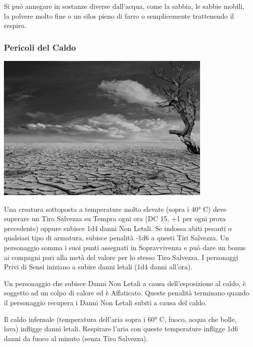 \begin{multicols}{2}
Si può annegare in sostanze diverse dall'acqua, come la sabbia, le sabbie mobili, la polvere molto fine o un silos pieno di farro o semplicemente trattenendo il respiro.

\subsubsection{Pericoli del Caldo}

\begin{center}
	\includegraphics[height=0.65\linewidth]{immagini/desert.png}
\end{center}


\label{pericoli-del-caldo}

Una creatura sottoposta a temperature molto elevate (sopra i 40° C) deve superare un Tiro Salvezza su Tempra ogni ora (DC 15, +1 per ogni prova precedente) oppure subisce 1d4 danni Non Letali. Se indossa abiti pesanti o qualsiasi tipo di armatura, subisce penalità -1d6 a questi Tiri Salvezza. Un personaggio somma i suoi punti assegnati in Sopravvivenza e può dare un bonus ai compagni pari alla metà del valore per lo stesso Tiro Salvezza. I personaggi Privi di Sensi iniziano a subire danni letali (1d4 danni all'ora).

Un personaggio che subisce Danni Non Letali a causa dell'esposizione al caldo, è soggetto ad un colpo di calore ed è Affaticato. Queste penalità terminano quando il personaggio recupera i Danni Non Letali subiti a causa del caldo.

Il caldo infernale (temperatura dell'aria sopra i 60° C, fuoco, acqua che bolle, lava) infligge danni letali. Respirare l'aria con queste temperature infligge 1d6 danni da fuoco al minuto (senza Tiro Salvezza).


\end{multicols}
